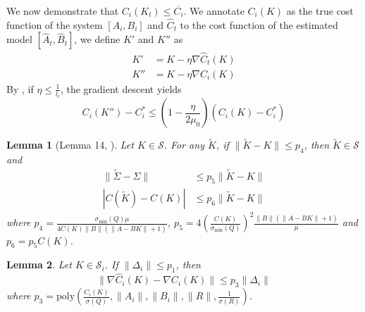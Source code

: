 \documentclass[letterpaper, 10 pt, conference]{ieeeconf}  %
\newtheorem{lemma}{Lemma}
\begin{document}
We now demonstrate that $C_i(K_t) \leq \overline{C_i}$. We annotate $C_i(K)$ as  the true cost function of the system $[A_i, B_i]$ and $\hat{C}_t$ to the cost function of the estimated model $[\hat{A}_t, \hat{B}_t]$, we define $K'$ and $K''$ as
\begin{align}
    K' &= K - \eta \nabla \hat{C}_{t}(K) \\
    K'' &= K - \eta \nabla C_i(K)
\end{align}
By \cite[Lemmas 2 \& 3]{zhao2025policy}, if $\eta \leq \frac{1}{l_i}$, the gradient descent yields 
\begin{equation}
\label{convergence}
    C_i(K'') - C_i^* \leq (1 - \frac{\eta}{2\mu_0}) (C_i(K) - C_i^*)
\end{equation} 
\begin{lemma}[Lemma 14, \cite{zhao2025policy}]
\label{lemma_3_5}
Let \( K \in \mathcal{S} \). For any \( \tilde{K} \), if \( \| \tilde{K} - K \| \leq p_4 \), then \( \tilde{K} \in \mathcal{S} \) and 
\begin{align}
\| \tilde{\Sigma} - \Sigma \| &\leq p_5 \| \tilde{K} - K \| \\
| C(\tilde{K}) - C(K) | &\leq p_6 \| \tilde{K} - K \|
\end{align}
where $p_4 = \frac{\sigma_{\min}(Q) \mu}{4 C(K) \|B\| \left( \|A - BK\| + 1 \right)}$, 
$p_5 = 4 \left( \frac{C(K)}{\sigma_{\min}(Q)} \right)^2 \frac{\|B\| \left( \|A - BK\| + 1 \right)}{\mu}$ and $p_6 = p_5C(K)$.
\end{lemma} \vspace{2mm} 
\begin{lemma}
\label{lemma_gradient_error}
Let \( K \in \mathcal{S}_i \). If $\|\Delta_i\| \leq p_1$, then
\begin{equation}
\|\nabla \hat{C}_{i}(K) - \nabla C_i(K)\| \leq p_3 \|\Delta_i\|
\end{equation}
where $p_3 = \mathrm{poly}\left( \frac{C_i(K)}{\sigma(Q)}, \|A_i\|, \|B_i\|, \|R\|, \frac{1}{\sigma(R)} \right)$.
\end{lemma} \vspace{2mm}
\end{document}
